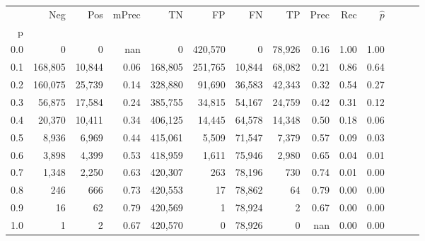 \begin{tabular}{rrrrrrrrrrrrrr}
\toprule
{} &      Neg &     Pos & mPrec &       TN &       FP &      FN &      TP &  Prec &   Rec & $\hat{p}$ \\
p   &          &         &       &          &          &         &         &       &       &           \\
\midrule
0.0 &        0 &       0 &   nan &        0 &  420,570 &       0 &  78,926 &  0.16 &  1.00 &      1.00 \\
0.1 &  168,805 &  10,844 &  0.06 &  168,805 &  251,765 &  10,844 &  68,082 &  0.21 &  0.86 &      0.64 \\
0.2 &  160,075 &  25,739 &  0.14 &  328,880 &   91,690 &  36,583 &  42,343 &  0.32 &  0.54 &      0.27 \\
0.3 &   56,875 &  17,584 &  0.24 &  385,755 &   34,815 &  54,167 &  24,759 &  0.42 &  0.31 &      0.12 \\
0.4 &   20,370 &  10,411 &  0.34 &  406,125 &   14,445 &  64,578 &  14,348 &  0.50 &  0.18 &      0.06 \\
0.5 &    8,936 &   6,969 &  0.44 &  415,061 &    5,509 &  71,547 &   7,379 &  0.57 &  0.09 &      0.03 \\
0.6 &    3,898 &   4,399 &  0.53 &  418,959 &    1,611 &  75,946 &   2,980 &  0.65 &  0.04 &      0.01 \\
0.7 &    1,348 &   2,250 &  0.63 &  420,307 &      263 &  78,196 &     730 &  0.74 &  0.01 &      0.00 \\
0.8 &      246 &     666 &  0.73 &  420,553 &       17 &  78,862 &      64 &  0.79 &  0.00 &      0.00 \\
0.9 &       16 &      62 &  0.79 &  420,569 &        1 &  78,924 &       2 &  0.67 &  0.00 &      0.00 \\
1.0 &        1 &       2 &  0.67 &  420,570 &        0 &  78,926 &       0 &   nan &  0.00 &      0.00 \\
\bottomrule
\end{tabular}
